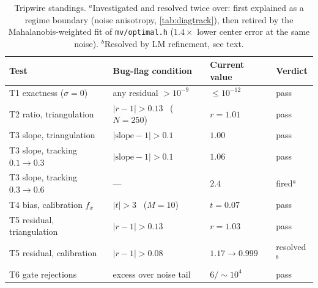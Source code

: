 \documentclass[11pt]{article}
\theoremstyle{definition}
\newcommand{\code}[1]{\texttt{#1}}
\begin{document}
\begin{table}[ht]
\centering
\small
\begin{tabular}{llll}
\toprule
Test & Bug-flag condition & Current value & Verdict \\
\midrule
T1 exactness ($\sigma{=}0$) & any residual $>10^{-9}$ & $\le10^{-12}$ & pass \\
T2 ratio, triangulation & $|r-1|>0.13$ \ ($N{=}250$) & $r=1.01$ & pass \\
T3 slope, triangulation & $|\text{slope}-1|>0.1$ & $1.00$ & pass \\
T3 slope, tracking $0.1\!\to\!0.3$ & $|\text{slope}-1|>0.1$ & $1.06$ & pass \\
T3 slope, tracking $0.3\!\to\!0.6$ & --- & $2.4$ & fired$^{a}$ \\
T4 bias, calibration $f_x$ & $|t|>3$ \ ($M{=}10$) & $t=0.07$ & pass \\
T5 residual, triangulation & $|r-1|>0.13$ & $r=1.03$ & pass \\
T5 residual, calibration & $|r-1|>0.08$ & $1.17\to0.999$ & resolved$^{b}$ \\
T6 gate rejections & excess over noise tail & $6/\sim10^4$ & pass \\
\bottomrule
\end{tabular}
\caption{Tripwire standings. $^{a}$Investigated and resolved twice
over: first explained as a regime boundary (noise anisotropy,
\autoref{tab:diagtrack}), then retired by the Mahalanobis-weighted
fit of \code{mv/optimal.h} ($1.4\times$ lower center error at the
same noise). $^{b}$Resolved by LM refinement, see text.}
\label{tab:tripwires}
\end{table}
\end{document}
